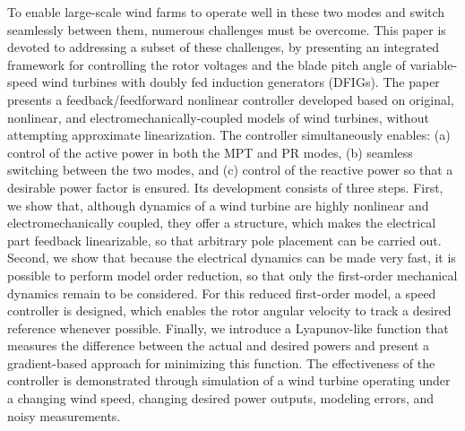 \documentclass[journal]{IEEEtran}
\begin{document}
To enable large-scale wind farms to operate well in these two modes and switch seamlessly between them, numerous challenges must be overcome. This paper is devoted to addressing a subset of these challenges, by presenting an integrated framework for controlling the rotor voltages and the blade pitch angle of variable-speed wind turbines with doubly fed induction generators (DFIGs). The paper presents a feedback/feedforward nonlinear controller developed based on original, nonlinear, and electromechanically-coupled models of wind turbines, without attempting approximate linearization. The controller simultaneously enables: (a) control of the active power in both the MPT and PR modes, (b) seamless switching between the two modes, and (c) control of the reactive power so that a desirable power factor is ensured. Its development consists of three steps. First, we show that, although dynamics of a wind turbine are highly nonlinear and electromechanically coupled, they offer a structure, which makes the electrical part feedback linearizable, so that arbitrary pole placement can be carried out. Second, we show that because the electrical dynamics can be made very fast, it is possible to perform model order reduction, so that only the first-order mechanical dynamics remain to be considered. For this reduced first-order model, a speed controller is designed, which enables the rotor angular velocity to track a desired reference whenever possible. Finally, we introduce a Lyapunov-like function that measures the difference between the actual and desired powers and present a gradient-based approach for minimizing this function. The effectiveness of the controller is demonstrated through simulation of a wind turbine operating under a changing wind speed, changing desired power outputs, modeling errors, and noisy measurements.
\end{document}
